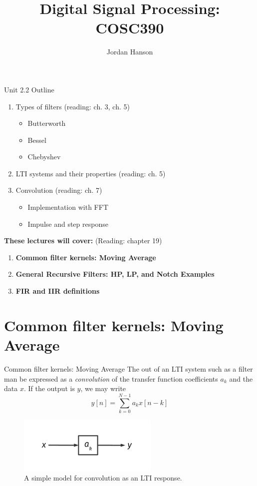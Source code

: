 \documentclass{beamer}
\title{Digital Signal Processing: COSC390}
\author{Jordan Hanson}
\institute{Whittier College Department of Physics and Astronomy}
\begin{document}
\maketitle

\begin{frame}{Unit 2.2 Outline}
\begin{enumerate}
\item Types of filters (reading: ch. 3, ch. 5)
\begin{itemize}
\item Butterworth
\item Bessel
\item Chebyshev
\end{itemize}
\item LTI systems and their properties (reading: ch. 5)
\item Convolution (reading: ch. 7)
\begin{itemize}
\item Implementation with FFT
\item Impulse and step response
\end{itemize}
\end{enumerate}
\textbf{These lectures will cover:} (Reading: chapter 19)
\begin{enumerate}
\item \textbf{Common filter kernels: Moving Average}
\item \textbf{General Recursive Filters: HP, LP, and Notch Examples}
\item \textbf{FIR and IIR definitions}
\end{enumerate}
\end{frame}

\section{Common filter kernels: Moving Average}

\begin{frame}{Common filter kernels: Moving Average}
The out of an LTI system such as a filter man be expressed as a \textit{convolution} of the transfer function coefficients $a_k$ and the data $x$. If the output is $y$, we may write
\begin{equation}
y[n] = \sum_{k=0}^{N-1} a_k x[n-k]
\end{equation}
\begin{figure}
\centering
\includegraphics[width=0.6\textwidth]{figures/kernel1.pdf}
\caption{\label{fig:kernel1} A simple model for convolution as an LTI response.}
\end{figure}
\end{frame}
\end{document}
